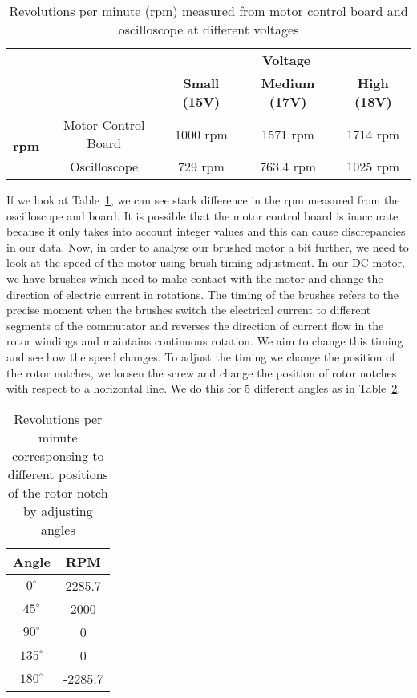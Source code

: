 \documentclass[12pt,a4paper]{report}
\begin{document}
\begin{table}[ht]
    \centering
    \caption{Revolutions per minute (rpm) measured from motor control board and oscilloscope at different voltages}
    \label{tab:volt_rpm}
    \begin{tabular}{|cc|c|c|c|}
        \hline
	    & & \multicolumn{3}{c|}{\textbf{Voltage}} \\
        \cline{3-5}
	    & & \textbf{Small (15V)} & \textbf{Medium (17V)} & \textbf{High (18V)} \\
        \hline
	    \multirow{2}{*}{\textbf{rpm}} & \multicolumn{1}{|c|}{Motor Control Board} & 1000 rpm & 1571 rpm  & 1714 rpm \\
	    \cline{2-5}
	    & \multicolumn{1}{|c|}{Oscilloscope} & 729 rpm  & 763.4 rpm & 1025 rpm \\
        \hline
    \end{tabular}
\end{table}

If we look at Table~\ref{tab:volt_rpm}, we can see stark difference in the rpm measured from the oscilloscope and board. It is possible that the motor control board is inaccurate because it only takes into account integer values and this can cause discrepancies in our data. 
Now, in order to analyse our brushed motor a bit further, we need to look at the speed of the motor using brush timing adjustment. In our DC motor, we have brushes which need to make contact with the motor and change the direction of electric current in rotations. The timing of the brushes refers to the precise moment when the brushes switch the electrical current to different segments of the commutator and  reverses the direction of current flow in the rotor windings and maintains continuous rotation. We aim to change this timing and see how the speed changes. To adjust the timing we change the position of the rotor notches, we loosen the screw and change the position of rotor notches with respect to a horizontal line. We do this for 5 different angles as in Table~\ref{tab:angle_rot}.

\begin{table}[ht]
	\centering
	\caption{Revolutions per minute corresponsing to different positions of the rotor notch by adjusting angles}
	\label{tab:angle_rot}
	\begin{tabular}{|c|c|}
		\hline
		Angle & RPM \\
		\hline
		\(0^{\circ}\) & 2285.7 \\
		\hline
		\(45^{\circ}\) & 2000 \\
		\hline
		\(90^{\circ}\) & 0 \\
		\hline
		\(135^{\circ}\) & 0 \\
		\hline
		\(180^{\circ}\) & -2285.7\\
		\hline
	\end{tabular}
\end{table}
\end{document}
